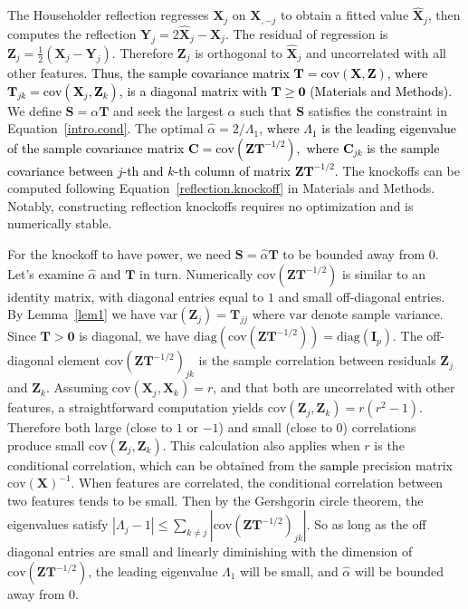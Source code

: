 \documentclass[12pt,Times]{article}
\def\tcb{\textcolor{black}}
\def\0{{\mathbf{0}}}
\def\T{{\mathbf{T}}}
\def\X{{\mathbf{X}}}
\def\Y{{\mathbf{Y}}}
\def\C{{\mathbf{C}}}
\def\Z{{\mathbf{Z}}}
\def\S{{\mathbf{S}}}
\def\I{{\mathbf{I}}}
\def\diag{{\textrm{diag}}}
\def\cov{{\textrm{cov}}}
\def\var{{\textrm{var}}}
\begin{document}
The Householder reflection regresses $\X_j$ on $\X_{,-j}$ to obtain a fitted value $\hat\X_j$, then computes the reflection $\Y_j =  2 \hat\X_j - \X_j$. The residual of regression is $\Z_j = \frac{1}{2}(\X_j - \Y_j)$. Therefore $\Z_j$ is orthogonal to $\hat\X_j$ and uncorrelated with all other features. \tcb{Thus, the sample covariance matrix $\T = \cov(\X, \Z)$, where $\T_{jk} = \cov(\X_j, \Z_k)$, is a diagonal matrix with $\T \ge \0$ (Materials and Methods).} We define $\S=\alpha\T$ and seek the largest $\alpha$ such that $\S$ satisfies the constraint in Equation~\eqref{intro.cond}. The optimal $\hat\alpha = 2 / \Lambda_1$, \tcb{where $\Lambda_1$ is the leading eigenvalue of the sample covariance matrix $\C=\cov(\Z \T^{-1/2}),$ where $\C_{jk}$ is the sample covariance between $j$-th and $k$-th column of matrix $\Z \T^{-1/2}.$}  The knockoffs can be computed following Equation~\eqref{reflection.knockoff} in Materials and Methods.  Notably, constructing reflection knockoffs requires no optimization and is numerically stable. 


For the knockoff to have power, we need $\S=\hat\alpha\T$ to be bounded away from $0$. Let's examine $\hat\alpha$ and $\T$ in turn. Numerically  $\cov(\Z \T^{-1/2})$ is similar to an identity matrix, with diagonal entries  equal to $1$ and small off-diagonal entries. By Lemma~\ref{lem1} we have $\var(\Z_j) = \T_{jj}$ where $\var$ denote sample variance.  Since $\T>\0$ is diagonal, we have $\diag(\cov(\Z \T^{-1/2})) = \diag(\I_p)$.  The off-diagonal element  $\cov(\Z \T^{-1/2})_{jk}$ is the sample correlation between residuals $\Z_j$ and $\Z_k$.  
%
Assuming $\cov(\X_j, \X_k) = r$, and that both are uncorrelated with other features, a straightforward computation yields $\cov(\Z_j, \Z_k) = r(r^2-1)$. Therefore both large (close to $1$ or $-1$) and small (close to $0$) correlations produce small $\cov(\Z_j, \Z_k)$. This calculation also applies when $r$ is the conditional correlation, which can be obtained from the \tcb{sample} precision matrix $\cov(\X)^{-1}$. When features are correlated, the conditional correlation between two features tends to be small.  
%
Then by the Gershgorin circle theorem, the eigenvalues  satisfy $|\Lambda_j-1| \le \sum_{k\ne j}|\cov(\Z \T^{-1/2})_{jk}|.$ So as long as the off diagonal entries are small and linearly diminishing with the dimension of $\cov(\Z \T^{-1/2})$, the leading eigenvalue $\Lambda_1$ will be small, and $\hat\alpha$ will be bounded away from $0$.  
\end{document}
